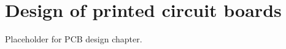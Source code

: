 \setchapterpreamble[u]{\margintoc}
\chapter{\color{gray} Design of printed circuit boards \color{black}}

Placeholder for PCB design chapter.
